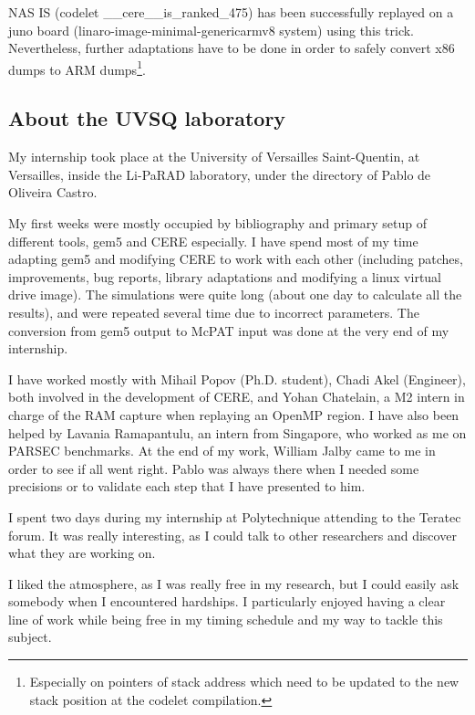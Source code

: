\documentclass{article}
\begin{document}
\begin{multicols}{2}
NAS IS (codelet \_\_cere\_\_is\_ranked\_475) has been successfully replayed on a juno board (linaro-image-minimal-genericarmv8 system) using this trick. Nevertheless, further adaptations have to be done in order to safely convert x86 dumps to ARM dumps\footnote{Especially on pointers of stack address which need to be updated to the new stack position at the codelet compilation.}.


\subsection{About the UVSQ laboratory}
My internship took place at the University of Versailles Saint-Quentin, at Versailles, inside the Li-PaRAD laboratory, under the directory of Pablo de Oliveira Castro.

My first weeks were mostly occupied by bibliography and primary setup of different tools, gem5 and CERE especially. I have spend most of my time adapting gem5 and modifying CERE to work with each other (including patches, improvements, bug reports, library adaptations and modifying a linux virtual drive image). The simulations were quite long (about one day to calculate all the results), and were repeated several time due to incorrect parameters. The conversion from gem5 output to McPAT input was done at the very end of my internship.

I have worked mostly with Mihail Popov (Ph.D. student), Chadi Akel (Engineer), both involved in the development of CERE, and Yohan Chatelain, a M2 intern in charge of the RAM capture when replaying an OpenMP region. I have also been helped by Lavania Ramapantulu, an intern from Singapore, who worked as me on PARSEC benchmarks. At the end of my work, William Jalby came to me in order to see if all went right. Pablo was always there when I needed some precisions or to validate each step that I have presented to him.

I spent two days during my internship at Polytechnique attending to the Teratec forum. It was really interesting, as I could talk to other researchers and discover what they are working on.

I liked the atmosphere, as I was really free in my research, but I could easily ask somebody when I encountered hardships. I particularly enjoyed having a clear line of work while being free in my timing schedule and my way to tackle this subject.

\end{multicols}
\newpage 
\end{document}
